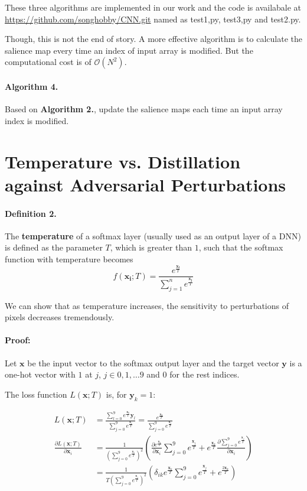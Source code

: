 \documentclass{article}
\begin{document}
These three algorithms are implemented in our work and the code is availabale at \url{https://github.com/songhobby/CNN.git} named as test1,py, test3,py and test2.py.

Though, this is not the end of story. A more effective algorithm is to calculate the salience map every time an index of input array is modified. But the computational cost is of $\mathcal{O}(N^2)$.
\paragraph{Algorithm 4.}
Based on \textbf{Algorithm 2.}, update the salience maps each time an input array index is modified.
\section{Temperature vs. Distillation against Adversarial Perturbations}

\paragraph{Definition 2.}
The \textbf{temperature} of a softmax layer (usually used as an output layer of a DNN) is defined as the parameter $T$, which is greater than $1$, such that the softmax function with temperature becomes 
\begin{equation}
	f(\mathbf{x_i};T)=\frac{e^{\frac{\mathbf{x_i}}{T}}}{\sum_{j=1}^n 
	e^{\frac{\mathbf{x_j}}{T}}}
\end{equation}

We can show that as temperature increases, the sensitivity to perturbations of pixels decreases tremendously.

\paragraph{Proof:}
Let $\mathbf{x}$ be the input vector to the softmax output layer and the target vector $\mathbf{y}$ is a one-hot vector with $1$ at $j$, $j\in{0,1,\dots 9}$ and $0$ for the rest indices.

The loss function $L(\mathbf{x};T)$ is, for $\mathbf{y}_k=1$:

\begin{align}
	L(\mathbf{x};T) &= \frac{\sum_{l=0}^9e^{\frac{\mathbf{x}_k}{T}}\mathbf{y}_l}{\sum_{j=0}^9 e^{\frac{\mathbf{x}_j}{T}}} = \frac{e^{\frac{\mathbf{x}_k}{T}}}{\sum_{j=0}^9 e^{\frac{\mathbf{x}_j}{T}}} \\
	\frac{\partial L(\mathbf{x};T)}{\partial \mathbf{x}_i} &= 
	\frac{1}{(\sum_{j=0}^9 e^{\frac{\mathbf{x}_j}{T}})^2}
	(
	\frac{\partial e^{\frac{\mathbf{x}_k}{T}}}{\partial \mathbf{x}_i}
	\sum_{j=0}^9 e^{\frac{\mathbf{x}_j}{T}} 
	+ e^{\frac{\mathbf{x}_k}{T}}
	\frac{\partial \sum_{j=0}^9 e^{\frac{\mathbf{x}_j}{T}}}{\partial \mathbf{x}_i}
	) \nonumber \\
	&=
	\frac{1}{T(\sum_{j=0}^9 e^{\frac{\mathbf{x}_j}{T}})^2} (
	\delta_{ik} e^{\frac{\mathbf{x}_k}{T}}
	\sum_{j=0}^9 e^{\frac{\mathbf{x}_j}{T}}+
	e^{\frac{2\mathbf{x}_k}{T}} ) \nonumber 
\end{align}
\end{document}

